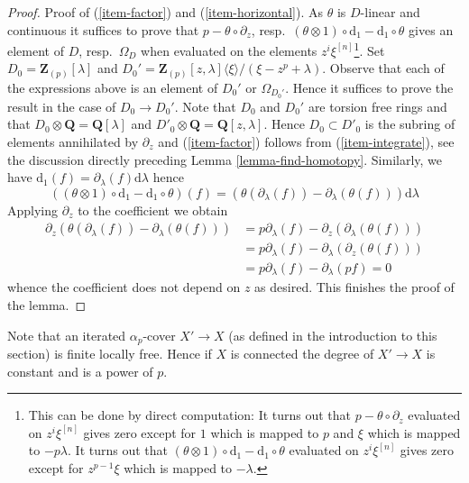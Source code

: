 \documentclass{stacks-project}
\theoremstyle{plain}
\theoremstyle{definition}
\theoremstyle{remark}
\numberwithin{equation}{subsection}
\begin{document}
\begin{proof}
\medskip\noindent
Proof of (\ref{item-factor}) and (\ref{item-horizontal}).
As $\theta$ is $D$-linear and continuous it suffices to prove that
$p - \theta \circ \partial_z$,
resp.\ $(\theta \otimes 1) \circ \text{d}_1 - \text{d}_1 \circ \theta$
gives an element of $D$, resp.\ $\Omega_D$ when evaluated on the
elements $z^i\xi^{[n]}$\footnote{This can be done by direct computation:
It turns out that $p - \theta \circ \partial_z$ evaluated on
$z^i\xi^{[n]}$ gives zero except for $1$ which is mapped to $p$ and
$\xi$ which is mapped to $-p\lambda$. It turns out that 
$(\theta \otimes 1) \circ \text{d}_1 - \text{d}_1 \circ \theta$
evaluated on $z^i\xi^{[n]}$ gives zero except for $z^{p - 1}\xi$
which is mapped to $-\lambda$.}.
Set $D_0 = \mathbf{Z}_{(p)}[\lambda]$ and
$D_0' = \mathbf{Z}_{(p)}[z, \lambda]\langle \xi \rangle/(\xi - z^p + \lambda)$.
Observe that each of the expressions above is an element of
$D_0'$ or $\Omega_{D_0'}$. Hence it suffices to prove the result
in the case of $D_0 \to D_0'$. Note that $D_0$ and $D_0'$
are torsion free rings and that $D_0 \otimes \mathbf{Q} = \mathbf{Q}[\lambda]$
and $D'_0 \otimes \mathbf{Q} = \mathbf{Q}[z, \lambda]$.
Hence $D_0 \subset D'_0$ is the subring of elements annihilated
by $\partial_z$ and (\ref{item-factor})
follows from (\ref{item-integrate}), see the discussion directly preceding
Lemma \ref{lemma-find-homotopy}. Similarly, we have
$\text{d}_1(f) = \partial_\lambda(f)\text{d}\lambda$ hence
$$
\left((\theta \otimes 1) \circ \text{d}_1 - \text{d}_1 \circ \theta\right)(f)
=
\left(\theta(\partial_\lambda(f)) - \partial_\lambda(\theta(f))\right)
\text{d}\lambda
$$
Applying $\partial_z$ to the coefficient we obtain
\begin{align*}
\partial_z\left(
\theta(\partial_\lambda(f)) - \partial_\lambda(\theta(f))
\right)
& =
p \partial_\lambda(f) - \partial_z(\partial_\lambda(\theta(f))) \\
& =
p \partial_\lambda(f) - \partial_\lambda(\partial_z(\theta(f))) \\
& =
p \partial_\lambda(f) - \partial_\lambda(p f) = 0
\end{align*}
whence the coefficient does not depend on $z$ as desired.
This finishes the proof of the lemma.
\end{proof}

\noindent
Note that an iterated $\alpha_p$-cover $X' \to X$ (as defined in the
introduction to this section) is finite locally free. Hence if $X$ is
connected the degree of $X' \to X$ is constant and is a power of $p$.
\end{document}
